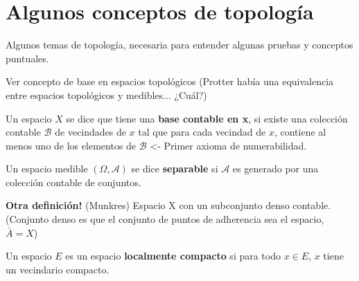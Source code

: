 \section{Algunos conceptos de topología}

Algunos temas de topología, necesaria para entender algunas pruebas y conceptos puntuales.


Ver concepto de base en espacios topológicos (Protter había una equivalencia entre espacios topológicos y medibles... ¿Cuál?)

\begin{boxDef}
	Un espacio $X$ se dice que tiene una \textbf{base contable en x}, si existe una colección contable $\mathcal{B}$ de vecindades de $x$ tal que para cada vecindad de $x$, contiene al menos uno de los elementos de $\mathcal{B}$ <- Primer axioma de numerabilidad.
\end{boxDef}

\begin{boxDef}

	Un espacio medible $(\Omega, \mathcal{A})$ se dice \textbf{separable} si $\mathcal{A}$ es generado por una colección contable de conjuntos. 

	\textbf{Otra definición!} (Munkres) Espacio X con un subconjunto denso contable. (Conjunto denso es que el conjunto de puntos de adherencia sea el espacio, $\bar{A} = X$)

\end{boxDef}

\begin{boxDef}

	Un espacio $E$ es un espacio \textbf{localmente compacto} si para todo $x \in E$, $x$ tiene un vecindario compacto.

\end{boxDef}





